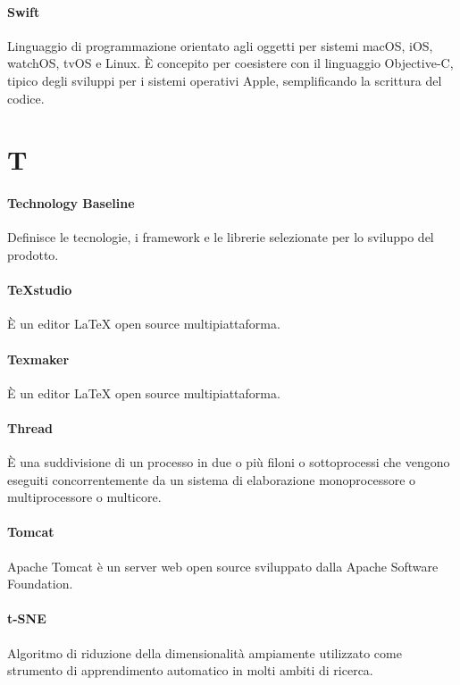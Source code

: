 \documentclass[]{article}
\begin{document}
	\paragraph*{Swift}
	Linguaggio di programmazione orientato agli oggetti per sistemi macOS, iOS, watchOS, tvOS e Linux. È concepito per coesistere con il linguaggio Objective-C, tipico degli sviluppi per i sistemi operativi Apple, semplificando la scrittura del codice.
	
	\newpage
	
	\section*{T}
	
	\paragraph*{Technology Baseline}
	Definisce le tecnologie, i framework e le librerie selezionate per lo sviluppo del prodotto.
	
	\paragraph*{TeXstudio}
	È un editor LaTeX open source multipiattaforma.
	
	\paragraph*{Texmaker}
	È un editor LaTeX open source multipiattaforma.
	
	\paragraph*{Thread}
	È una suddivisione di un processo in due o più filoni o sottoprocessi che vengono eseguiti concorrentemente da un sistema di elaborazione monoprocessore o multiprocessore o multicore.
	
	\paragraph*{Tomcat}
	Apache Tomcat è un server web open source sviluppato dalla Apache Software Foundation.
	
	\paragraph*{t-SNE}
	Algoritmo di riduzione della dimensionalità ampiamente utilizzato come strumento di apprendimento automatico in molti ambiti di ricerca.
	
\end{document}
